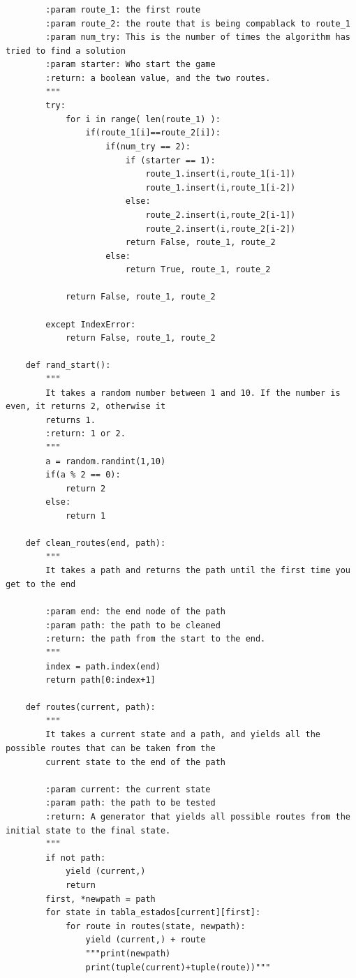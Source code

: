 \documentclass{article}
\begin{document}
\begin{lstlisting}
        :param route_1: the first route
        :param route_2: the route that is being compablack to route_1
        :param num_try: This is the number of times the algorithm has tried to find a solution
        :param starter: Who start the game
        :return: a boolean value, and the two routes.
        """
        try:
            for i in range( len(route_1) ):
                if(route_1[i]==route_2[i]):
                    if(num_try == 2):
                        if (starter == 1):
                            route_1.insert(i,route_1[i-1])
                            route_1.insert(i,route_1[i-2])
                        else:
                            route_2.insert(i,route_2[i-1])
                            route_2.insert(i,route_2[i-2])
                        return False, route_1, route_2
                    else:
                        return True, route_1, route_2
                
            return False, route_1, route_2
    
        except IndexError:
            return False, route_1, route_2
        
    def rand_start():
        """
        It takes a random number between 1 and 10. If the number is even, it returns 2, otherwise it
        returns 1.
        :return: 1 or 2.
        """
        a = random.randint(1,10)
        if(a % 2 == 0):
            return 2
        else:
            return 1
        
    def clean_routes(end, path):
        """
        It takes a path and returns the path until the first time you get to the end
        
        :param end: the end node of the path
        :param path: the path to be cleaned
        :return: the path from the start to the end.
        """
        index = path.index(end)
        return path[0:index+1]
    
    def routes(current, path):
        """
        It takes a current state and a path, and yields all the possible routes that can be taken from the
        current state to the end of the path
        
        :param current: the current state
        :param path: the path to be tested
        :return: A generator that yields all possible routes from the initial state to the final state.
        """
        if not path:
            yield (current,)
            return
        first, *newpath = path
        for state in tabla_estados[current][first]:
            for route in routes(state, newpath):
                yield (current,) + route
                """print(newpath)
                print(tuple(current)+tuple(route))"""
    

\end{lstlisting}
\end{document}
